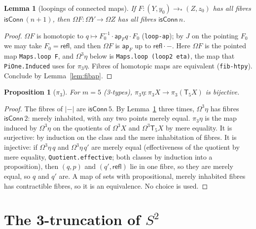 \documentclass[11pt]{amsart}
\newtheorem{proposition}[theorem]{Proposition}
\newtheorem{lemma}[theorem]{Lemma}
\theoremstyle{definition}
\theoremstyle{remark}
\newcommand{\Om}{\Omega}
\newcommand{\Tr}[1]{\mathsf{T}_{#1}}
\newcommand{\un}[1]{|#1|}
\newcommand{\code}[1]{\texttt{#1}}
\newcommand{\cC}{\mathsf{isConn}}
\begin{document}
\begin{lemma}[loopings of connected maps]\label{lem:loopconn}
If $F:(Y,y_0)\to_*(Z,z_0)$ has all fibres $\cC\,(n+1)$, then
$\Om F:\Om Y\to\Om Z$ has all fibres $\cC\,n$.
\end{lemma}
\begin{proof}
$\Om F$ is homotopic to $q\mapsto F_0^{-1}\cdot\mathsf{ap}_Fq\cdot F_0$
(\code{loop-ap}); by $J$ on the pointing $F_0$ we may take
$F_0=\mathsf{refl}$, and then $\Om F$ is $\mathsf{ap}_F$ up to
$\mathsf{refl}\cdot-$. Here $\Om F$ is the pointed map
\code{Maps.loop F}, and $\Om^3\eta$ below is \code{Maps.loop (loop2 eta)},
the map that \code{PiOne.Induced} uses for $\pi_3\eta$. Fibres of homotopic maps are equivalent
(\code{fib-htpy}). Conclude by Lemma~\ref{lem:fibap}.
\end{proof}

\begin{proposition}[$\pi_3$]\label{prop:pi3}
For $m=5$ (3-types), $\pi_3\eta:\pi_3X\to\pi_3(\Tr5X)$ is bijective.
\end{proposition}
\begin{proof}
The fibres of $\un-$ are $\cC\,5$. By Lemma~\ref{lem:loopconn} three
times, $\Om^3\eta$ has fibres $\cC\,2$: merely inhabited, with any two
points merely equal. $\pi_3\eta$ is the map induced by $\Om^3\eta$ on the
quotients of $\Om^3X$ and $\Om^3\Tr5X$ by mere equality. It is
surjective: by induction on the class and the mere inhabitation of
fibres. It is injective: if $\Om^3\eta\,q$ and $\Om^3\eta\,q'$ are merely
equal (effectiveness of the quotient by mere equality,
\code{Quotient.effective}; both classes by induction into a
proposition), then $(q,p)$ and $(q',\mathsf{refl})$ lie in one fibre, so they are
merely equal, so $q$ and $q'$ are. A map of sets with propositional,
merely inhabited fibres has contractible fibres, so it is an equivalence.
No choice is used.
\end{proof}

\section{The 3-truncation of $S^2$}\label{sec:sphere}
\end{document}

